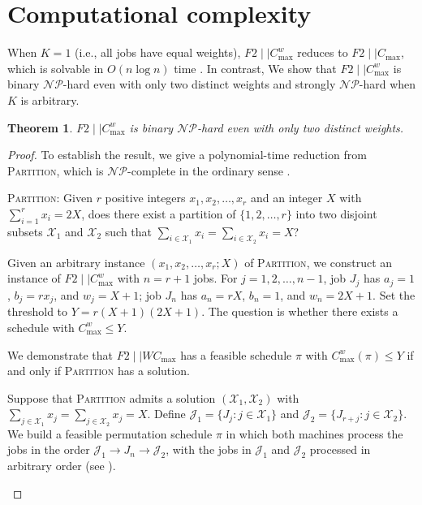 \documentclass[12pt]{article}
\newtheorem{theorem}{Theorem}[section]
\let\origsection\section
\renewcommand{\section}{\FloatBarrier\origsection}
\begin{document}
\begin{sloppypar}
        \section{Computational complexity}  \label{sec:complexity}
        
        When $K=1$ (i.e., all jobs have equal weights), $F2 \mid \mid C_{\max}^w$ reduces to $F2 \mid \mid C_{\max}$, which is solvable in $O(n \log n)$ time \citep{Johnson1954NRL}. In contrast, We show that $F2 \mid \mid C_{\max}^w$ is binary $\mathcal{NP}$-hard even with only two distinct weights and strongly $\mathcal{NP}$-hard when $K$ is arbitrary.
        
        \begin{theorem}\label{thm:nphard}
            $F2 \mid \mid C_{\max}^w$ is binary $\mathcal{NP}$-hard even with only two distinct weights.
        \end{theorem}
        \begin{proof}
            To establish the result, we give a polynomial-time reduction from \textsc{Partition}, which is $\mathcal{NP}$-complete in the ordinary sense \citep{GareyJohnson1979computer}.
            
            \textsc{Partition}: Given $r$ positive integers $x_1, x_2, \ldots, x_r$ and an integer $X$ with
            $\sum_{i=1}^{r}x_i=2X$, does there exist a partition of $\{1, 2, \ldots, r\}$ into two disjoint subsets $\mathcal{X}_1$ and $\mathcal{X}_2$ such that $\sum_{i \in \mathcal{X}_1} x_i=\sum_{i\in \mathcal{X}_2} x_i=X$?
            
            Given an arbitrary instance $(x_1, x_2, \ldots, x_r; X)$ of \textsc{Partition}, we construct an instance of $F2 \mid \mid C_{\max}^w$ with $n=r+1$ jobs. For $j=1, 2, \ldots, n-1$, job $J_j$ has $a_j=1$, $b_j=r x_j$, and $w_j=X+1$; job $J_n$ has $a_n=rX$, $b_n=1$, and $w_n=2X+1$. Set the threshold to $Y=r(X+1)(2X+1)$. The question is whether there exists a schedule with $C_{\max}^w \leq Y$.
            
            We demonstrate that $F2 \mid \mid W C_{\max}$ has a feasible schedule $\pi$ with $C_{\max}^w(\pi) \leq Y$ if and only if \textsc{Partition} has a solution.
            
            Suppose that \textsc{Partition} admits a solution $(\mathcal{X}_1, \mathcal{X}_2)$ with $\sum_{j \in \mathcal{X}_1} x_j = \sum_{j \in \mathcal{X}_2} x_j=X$. Define $\mathcal{J}_1=\{J_j: j \in \mathcal{X}_1\}$ and $\mathcal{J}_2=\{J_{r+j}: j \in \mathcal{X}_2\}$. We build a feasible permutation schedule $\pi$ in which both machines process the jobs in the order $\mathcal{J}_1 \to J_n \to \mathcal{J}_2$, with the jobs in $\mathcal{J}_1$ and $\mathcal{J}_2$ processed in arbitrary order (see ). 
            \begin{figure}[H]
                \centering
                \begin{tikzpicture}[x=0.15in, y=0.3in]
                    

\end{tikzpicture}
\end{figure}
\end{proof}
\end{sloppypar}
\end{document}
